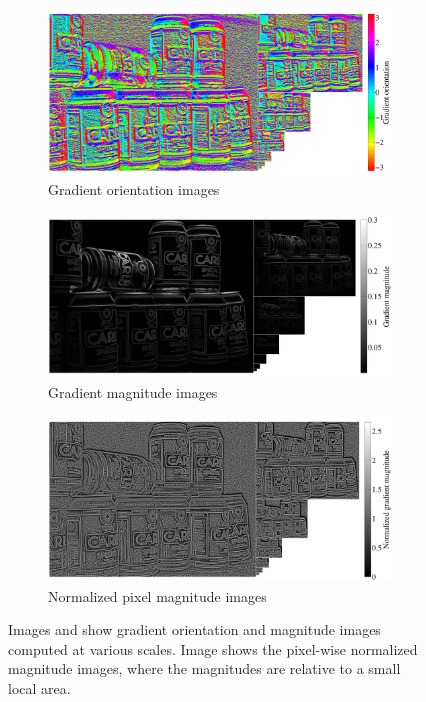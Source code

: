 \documentclass[thesis.tex]{subfiles}
\begin{document}
\begin{figure}[p]
    \centering
    \begin{subfigure}[t]{0.97\textwidth}
		\includegraphics[width=\textwidth]{img/cellHistScaleSpacesV.pdf}
    	\caption{Gradient orientation images }
    	\label{fig:cellHistScaleSpacesV}
	\end{subfigure}
    \begin{subfigure}[t]{0.97\textwidth}
		\includegraphics[width=\textwidth]{img/cellHistScaleSpacesM.pdf}
    	\caption{Gradient magnitude images}
    	\label{fig:cellHistScaleSpacesM}
	\end{subfigure}
	\begin{subfigure}[t]{0.97\textwidth}
		\includegraphics[width=\textwidth]{img/cellHistScaleSpacesMnorm.pdf}
    	\caption{Normalized pixel magnitude images}
    	\label{fig:cellHistScaleSpacesMnorm}
	\end{subfigure}
	\caption{Images  and  show gradient orientation and magnitude images computed at various scales. Image  shows the pixel-wise normalized magnitude images, where the magnitudes are relative to a small local area.}
	\label{fig:cellHistScaleSpacesVM}
\end{figure}
\end{document}
